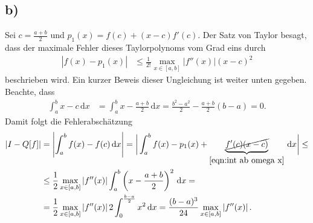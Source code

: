 \documentclass[english, parskip=full]{scrartcl}
\newcommand{\intx}{}
\newcommand{\kla}{}
\begin{document}
\subsection*{b)}
Sei $c=\frac{a+b}{2}$ und $p_1(x)=f(c)+(x-c)f'(c)$.
Der Satz von Taylor besagt, dass der maximale Fehler dieses Taylorpolynoms vom Grad eins durch 
\begin{align}
\left\vert f(x)-p_1(x)\right\vert&\le \frac{1}{2!}\max_{x\in[a,b]}|f''(x)|(x-c)^2
\end{align}
beschrieben wird.
Ein kurzer Beweis dieser Ungleichung ist weiter unten gegeben.
Beachte, dass
\begin{align}
\intx\int_{a}^{b}x-c\, \mathrm{d}x&=\intx\int_{a}^{b}x-\frac{a+b}{2}\, \mathrm{d}x=\frac{b^2-a^2}{2}-\frac{a+b}{2}(b-a)=0. \label{eqn:int ab omega x}
\end{align}
Damit folgt die Fehlerabschätzung
\begin{align}
|I-Q[f]|&=\left\vert\intx\int_{a}^{b}f(x)-f(c)\, \mathrm{d}x \right\vert = \bigg\vert\intx\int_{a}^{b} f(x)-p_1(x)+\underbrace{\cancel{f'(c)(x-c)}}_{\eqref{eqn:int ab omega x}} \, \mathrm{d}x\bigg\vert\le\\
&\le\frac{1}{2}\max_{x\in[a,b]}\left\vert f''(x) \right\vert\intx\int_{a}^{b}\kla\left( x-\frac{a+b}{2} \right)^2\, \mathrm{d}x=\\
&=\frac{1}{2}\max_{x\in[a,b]}\left\vert f''(x) \right\vert 2\intx\int_{0}^{\frac{b-a}{2}}x^2\,\mathrm{d}x=\frac{(b-a)^3}{24}\max_{x\in[a,b]}\left\vert f''(x) \right\vert .
\end{align}
\end{document}
